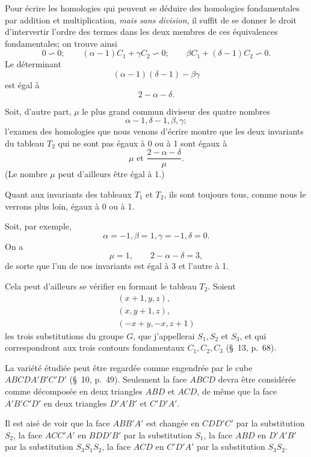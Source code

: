 \documentclass{article}
\begin{document}
Pour écrire les homologies qui peuvent se déduire des homologies fondamentales par addition et multiplication, \emph{mais sans division}, il suffit de se donner le droit d'intervertir l'ordre des termes dans les deux membres de ces équivalences fondamentales; on trouve ainsi
\[ 0 \backsim 0; \qquad (\alpha-1) C_{1} + \gamma C_{2} \backsim 0; \qquad \beta C_{1} + (\delta-1) C_{2} \backsim 0. \]
Le déterminant
\[ (\alpha-1)(\delta-1) - \beta\gamma \]
est égal à
\[ 2 - \alpha - \delta. \]

Soit, d'autre part, $\mu$ le plus grand commun diviseur des quatre nombres
\[ \alpha-1, \delta-1, \beta, \gamma; \]
l'examen des homologies que nous venons d'écrire montre que les deux invariants du tableau $T_{2}$ qui ne sont pas égaux à 0 ou à 1 sont égaux à
\[ \mu \text{ et } \frac{2-\alpha-\delta}{\mu}. \]
(Le nombre $\mu$ peut d'ailleurs être égal à 1.)

Quant aux invariants des tableaux $T_{1}$ et $T_{2}$, ils sont toujours tous, comme nous le verrons plus loin, égaux à 0 ou à 1.

Soit, par exemple,
\[ \alpha = -1, \beta = 1, \gamma = -1, \delta = 0. \]
On a
\[ \mu = 1, \qquad 2-\alpha-\delta = 3, \]
de sorte que l'un de nos invariants est égal à 3 et l'autre à 1.

Cela peut d'ailleurs se vérifier en formant le tableau $T_{2}$. Soient
\[ \begin{gathered} (x+1, y, z),\\ (x, y+1, z),\\ (-x+y, -x, z+1) \end{gathered} \]
les trois substitutions du groupe $G$, que j'appellerai $S_{1}, S_{2}$ et $S_{3}$, et qui correspondront aux trois contours fondamentaux $C_{1}, C_{2}, C_{3}$ (\S~13, p.\ 68).

La variété étudiée peut être regardée comme engendrée par le cube $ABCDA'B'C'D'$ (\S~10, p.\ 49). Seulement la face $ABCD$ devra être considérée comme décomposée en deux triangles $ABD$ et $ACD$, de même que la face $A'B'C'D'$ en deux triangles $D'A'B'$ et $C'D'A'$.

Il est aisé de voir que la face $ABB'A'$ est changée en $CDD'C'$ par la substitution $S_{2}$, la face $ACC'A'$ en $BDD'B'$ par la substitution $S_{1}$, la face $ABD$ en $D'A'B'$ par la substitution $S_{3} S_{1} S_{2}$, la face $ACD$ en $C'D'A'$ par la substitution $S_{3} S_{2}$.
\end{document}
